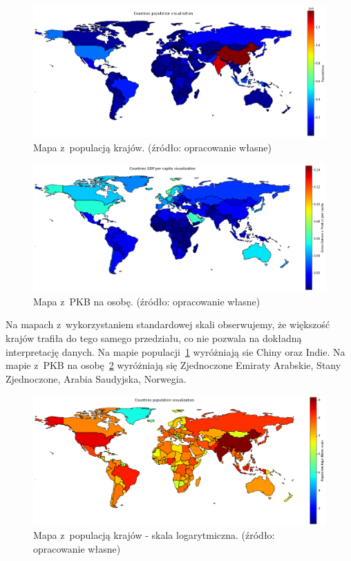 \documentclass[11pt]{report}
\begin{document}
    \begin{figure}[!htp]
        \centering
        \includegraphics[width=\linewidth]{fig/CLUST/population.png}
        \caption{Mapa z~populacją krajów. (źródło: opracowanie własne)}
        \label{fig:clustPop}
    \end{figure}

    \begin{figure}[!htp]
        \centering
        \includegraphics[width=\linewidth]{fig/CLUST/gdp.png}
        \caption{Mapa z~PKB na osobę. (źródło: opracowanie własne)}
        \label{fig:clustGDP}
    \end{figure}

    Na mapach z~wykorzystaniem standardowej skali obserwujemy, że większość krajów trafiła do tego samego przedziału, co nie pozwala na dokładną interpretację danych.
    Na mapie populacji~\ref{fig:clustPop} wyróżniają sie Chiny oraz Indie.
    Na mapie z~PKB na osobę~\ref{fig:clustGDP} wyróżniają się Zjednoczone Emiraty Arabskie, Stany Zjednoczone, Arabia Saudyjska, Norwegia.

    \begin{figure}[!htp]
        \centering
        \includegraphics[width=\linewidth]{fig/CLUST/population_log.png}
        \caption{Mapa z~populacją krajów - skala logarytmiczna. (źródło: opracowanie własne)}
        \label{fig:clustPop_log}
    \end{figure}
\end{document}
